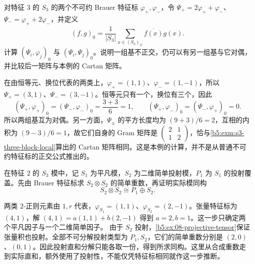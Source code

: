 \begin{optionalexercise}\label{b5:ex:08-naive-brauer-inner-product}
	对特征 \(3\) 的 \(S_3\) 的两个不可约 Brauer 特征标 \(\varphi_+,\varphi_-\)，令 \(\Psi_+=2\varphi_++\varphi_-\)、\(\Psi_-=\varphi_++2\varphi_-\)，并定义
	\[
		(f,g)_0=\frac1{|S_3|}\sum_{x\in(S_3)_{3'}}\overline{f(x)}g(x).
	\]
	计算 \((\Psi_i,\varphi_j)_0\) 与 \((\Psi_i,\Psi_j)_0\)。说明一组基不正交，仍可以有另一组基与它对偶，并比较后一矩阵与本例的 Cartan 矩阵。
\end{optionalexercise}
\begin{solution}
	在由恒等元、换位代表的两类上，\(\varphi_+=(1,1)\)、\(\varphi_-=(1,-1)\)，所以 \(\Psi_+=(3,1)\)、\(\Psi_-=(3,-1)\)。恒等元只有一个，换位有三个，因此
	\[
		(\Psi_+,\varphi_+)_0=(\Psi_-,\varphi_-)_0=\frac{3+3}{6}=1, \qquad (\Psi_+,\varphi_-)_0=(\Psi_-,\varphi_+)_0=0.
	\]
	所以两组基互为对偶。另一方面，\(\Psi_\pm\) 的平方长度均为 \((9+3)/6=2\)，互相的内积为 \((9-3)/6=1\)，故它们自身的 Gram 矩阵是 \(\left(\begin{smallmatrix}2&1\\1&2\end{smallmatrix}\right)\)，恰与\cref{b5:exm:s3-three-block-local}算出的 Cartan 矩阵相同。这是本例的计算，并不是从普通不可约特征标的正交公式推出的。
\end{solution}

\begin{optionalexercise}\label{b5:ex:08-s3-two-tensor}
	在特征 \(2\) 的 \(S_3\) 模中，记 \(S_1\) 为平凡模，\(S_2\) 为二维简单投射模，\(P_1\) 为 \(S_1\) 的投射覆盖。先由 Brauer 特征标求 \(S_2\otimes S_2\) 的简单重数，再证明实际模同构
	\[
		S_2\otimes S_2\cong P_1\oplus S_2.
	\]
\end{optionalexercise}
\begin{solution}
	两类 \(2\)-正则元素由 \(1,r\) 代表，\(\varphi_{S_1}=(1,1)\)、\(\varphi_{S_2}=(2,-1)\)。张量特征标为 \((4,1)\)，解 \((4,1)=a(1,1)+b(2,-1)\) 得到 \(a=2,b=1\)。这一步只确定两个平凡因子与一个二维简单因子。 由于 \(S_2\) 投射，\cref{b5:ex:08-projective-tensor}保证张量积也投射。全部不可分解投射类型为 \(P_1,S_2\)，它们的简单重数分别是 \((2,0)\)、\((0,1)\)。因此投射直和分解只能各取一份，得到所求同构。这里从合成重数走到实际直和，额外使用了投射性，不能仅凭特征标相同就作这一步推断。
\end{solution}


